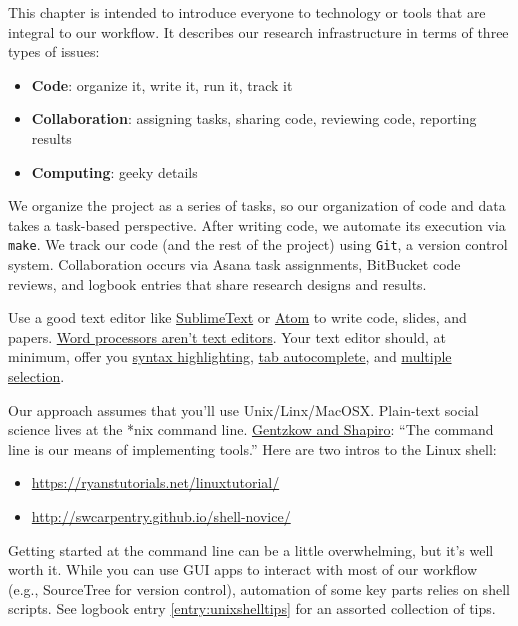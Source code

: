 This chapter is intended to introduce everyone to technology or tools that are integral to our workflow.
It describes our research infrastructure in terms of three types of issues:
\begin{itemize}
\item \textbf{Code}: organize it, write it, run it, track it
\item \textbf{Collaboration}: assigning tasks, sharing code, reviewing code, reporting results
\item \textbf{Computing}: geeky details
\end{itemize}

We organize the project as a series of tasks, so our organization of code and data takes a task-based perspective.
After writing code, we automate its execution via \texttt{make}.
We track our code (and the rest of the project) using \texttt{Git}, a version control system.
Collaboration occurs via Asana task assignments, BitBucket code reviews, and logbook entries that share research designs and results.

Use a good text editor like \href{https://www.sublimetext.com/}{SublimeText} or \href{https://atom.io/}{Atom} to write code, slides, and papers.
\href{http://plain-text.co/write-and-edit.html}{Word processors aren't text editors}.
Your text editor should, at minimum, offer you
\href{https://en.wikipedia.org/wiki/Syntax_highlighting}{syntax highlighting},
\href{https://en.wikipedia.org/wiki/Command-line_completion}{tab autocomplete},
and \href{https://www.sublimetext.com/}{multiple selection}.

Our approach assumes that you'll use Unix/Linx/MacOSX.
Plain-text social science lives at the *nix command line.
\href{https://github.com/gslab-econ/ra-manual/wiki/Getting-Started}{Gentzkow and Shapiro}: ``The command line is our means of implementing tools.''
Here are two intros to the Linux shell:
\begin{itemize}
	\item \url{https://ryanstutorials.net/linuxtutorial/}
	\item \url{http://swcarpentry.github.io/shell-novice/}
\end{itemize}
Getting started at the command line can be a little overwhelming, but it's well worth it.
While you can use GUI apps to interact with most of our workflow (e.g., SourceTree for version control),
automation of some key parts relies on shell scripts.
See logbook entry \ref{entry:unixshelltips} for an assorted collection of tips.
